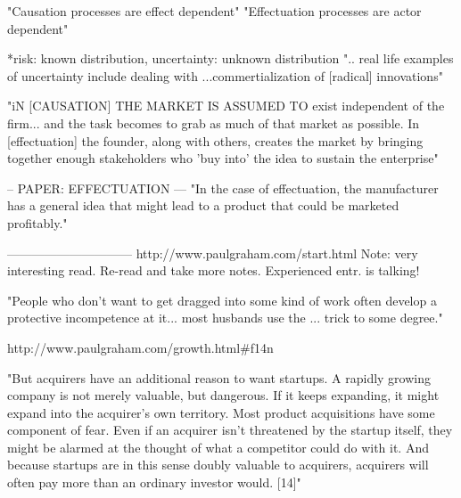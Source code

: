   "Causation processes are effect dependent"
  "Effectuation processes are actor dependent"
  
  *risk: known distribution, uncertainty: unknown distribution
  ".. real life examples of uncertainty include dealing with ...commertialization of [radical] innovations"
  
  "iN [CAUSATION] THE MARKET IS ASSUMED TO exist independent of the firm... and the task becomes to 
  grab as much of that market as possible. In [effectuation] the founder, along with others, creates the market by bringing together 
  enough stakeholders who 'buy into' the idea to sustain the enterprise"

  

 
-- PAPER: EFFECTUATION ---
"In the case of effectuation, the manufacturer has a general idea that
might lead to a product that could be marketed profitably."


------------------------------
http://www.paulgraham.com/start.html
Note: very interesting read. Re-read and take more notes. Experienced entr. is talking!

"People who don't want to get dragged into some kind of work often develop a protective incompetence at it...
most husbands use the ... trick to some degree."


http://www.paulgraham.com/growth.html#f14n

"But acquirers have an additional reason to want startups. A rapidly growing company is not merely valuable, but dangerous. If it keeps expanding, it might expand into the acquirer's own territory. Most product acquisitions have some component of fear. Even if an acquirer isn't threatened by the startup itself, they might be alarmed at the thought of what a competitor could do with it. And because startups are in this sense doubly valuable to acquirers, acquirers will often pay more than an ordinary investor would. [14]"


